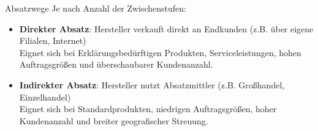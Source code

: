 \begin{definition}{Absatzwege}
Je nach Anzahl der Zwischenstufen:
\begin{itemize}
    \item \textbf{Direkter Absatz}: Hersteller verkauft direkt an Endkunden (z.B. über eigene Filialen, Internet)\\
    Eignet sich bei Erklärungsbedürftigen Produkten, Serviceleistungen, hohen Auftragsgrößen und überschaubarer Kundenanzahl.
    \item \textbf{Indirekter Absatz}: Hersteller nutzt Absatzmittler (z.B. Großhandel, Einzelhandel)\\
    Eignet sich bei Standardprodukten, niedrigen Auftragsgrößen, hoher Kundenanzahl und breiter geografischer Streuung.
\end{itemize}
\end{definition}

\multend

